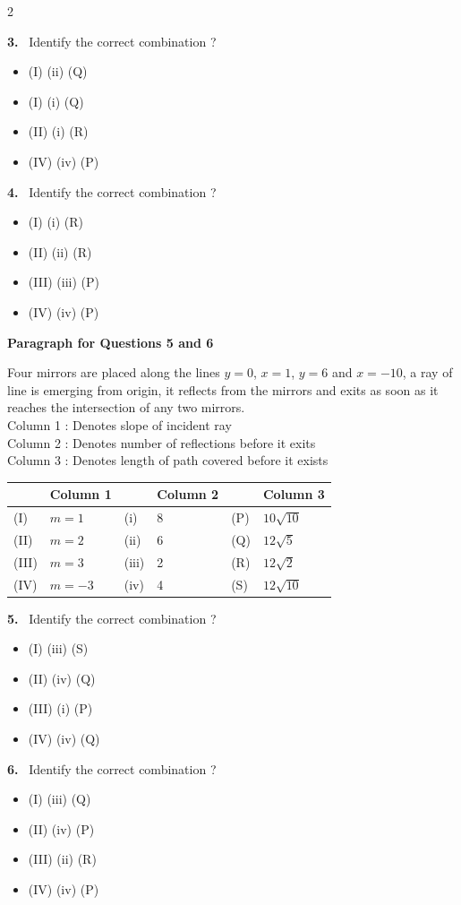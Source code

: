 \documentclass[10pt]{extarticle}
\newcommand{\qn}[1]{\par\smallskip\noindent\textbf{#1.}~}
\newcommand{\paraq}[2]{\par\smallskip\noindent\textbf{Paragraph for Questions #1 and #2}\par}
\newenvironment{qoptions}{\begin{itemize}[leftmargin=1.8em,itemsep=1pt,topsep=2pt,label={}]}{\end{itemize}}
\newcommand{\opt}[2]{\item[(#1)] #2}
\begin{document}
\begin{multicols}{2}
\qn{3} Identify the correct combination ?
\begin{qoptions}
\opt{A}{(I) (ii) (Q)}
\opt{B}{(I) (i) (Q)}
\opt{C}{(II) (i) (R)}
\opt{D}{(IV) (iv) (P)}
\end{qoptions}

\qn{4} Identify the correct combination ?
\begin{qoptions}
\opt{A}{(I) (i) (R)}
\opt{B}{(II) (ii) (R)}
\opt{C}{(III) (iii) (P)}
\opt{D}{(IV) (iv) (P)}
\end{qoptions}

\paraq{5}{6}
Four mirrors are placed along the lines $y=0$, $x=1$, $y=6$ and $x=-10$, a ray of line is emerging from origin, it reflects from the mirrors and exits as soon as it reaches the intersection of any two mirrors.\\
Column 1 : Denotes slope of incident ray\\
Column 2 : Denotes number of reflections before it exits\\
Column 3 : Denotes length of path covered before it exists
\begin{center}\footnotesize
\begin{tabular}{|p{0.6cm}|p{1.4cm}|p{0.6cm}|p{1.4cm}|p{0.5cm}|p{1.8cm}|}
\hline
 & \centering Column 1 & & \centering Column 2 & & \centering Column 3\tabularnewline
\hline
(I) & $m=1$ & (i) & 8 & (P) & $10\sqrt{10}$\\
(II) & $m=2$ & (ii) & 6 & (Q) & $12\sqrt5$\\
(III) & $m=3$ & (iii) & 2 & (R) & $12\sqrt2$\\
(IV) & $m=-3$ & (iv) & 4 & (S) & $12\sqrt{10}$\\
\hline
\end{tabular}
\end{center}

\qn{5} Identify the correct combination ?
\begin{qoptions}
\opt{A}{(I) (iii) (S)}
\opt{B}{(II) (iv) (Q)}
\opt{C}{(III) (i) (P)}
\opt{D}{(IV) (iv) (Q)}
\end{qoptions}

\qn{6} Identify the correct combination ?
\begin{qoptions}
\opt{A}{(I) (iii) (Q)}
\opt{B}{(II) (iv) (P)}
\opt{C}{(III) (ii) (R)}
\opt{D}{(IV) (iv) (P)}
\end{qoptions}


\end{multicols}
\end{document}
